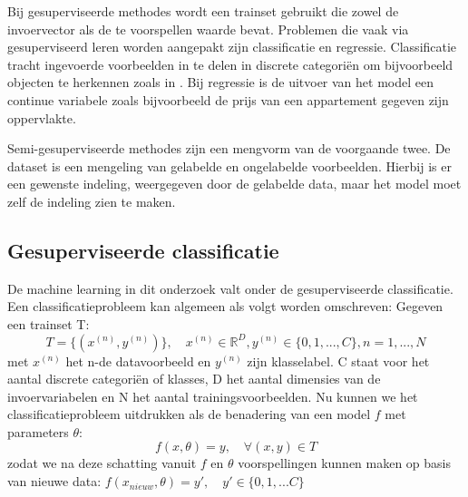 \npar Bij gesuperviseerde methodes wordt een trainset gebruikt die zowel de invoervector als de te voorspellen waarde bevat. Problemen die vaak via gesuperviseerd leren worden aangepakt zijn classificatie en regressie. Classificatie tracht ingevoerde voorbeelden in te delen in discrete categori\"en om bijvoorbeeld objecten te herkennen zoals in \cite{krizhevsky2012imagenet}. Bij regressie is de uitvoer van het model een continue variabele zoals bijvoorbeeld de prijs van een appartement gegeven zijn oppervlakte.

\npar Semi-gesuperviseerde methodes zijn een mengvorm van de voorgaande twee. De dataset is een mengeling van gelabelde en ongelabelde voorbeelden. Hierbij is er een gewenste indeling, weergegeven door de gelabelde data, maar het model moet zelf de indeling zien te maken.


\subsection{Gesuperviseerde classificatie}

\npar De machine learning in dit onderzoek valt onder de gesuperviseerde classificatie. Een classificatieprobleem kan algemeen als volgt worden omschreven:
\npar Gegeven een trainset T:
\begin{equation}
T = \{ ( x^{(n)}, y^{(n)})\},\quad x^{(n)}\in\mathbb{R}^D, y^{(n)}\in\{0,1,...,C\}, n=1,...,N
\end{equation}
met $x^{(n)}$ het n-de datavoorbeeld en $y^{(n)}$ zijn klasselabel. C staat voor het aantal discrete categori\"en of klasses, D het aantal dimensies van de invoervariabelen en N het aantal trainingsvoorbeelden. Nu kunnen we het classificatieprobleem uitdrukken als de benadering van een model $f$ met parameters $\theta$:
\begin{equation}\label{eq:classifier}
f(x,\theta) = y,\quad\forall(x,y) \in T
\end{equation}
zodat we na deze schatting vanuit $f$ en $\theta$ voorspellingen kunnen maken op basis van nieuwe data: $f(x_{nieuw},\theta)=y', \quad y' \in\{0,1,...C\}$


